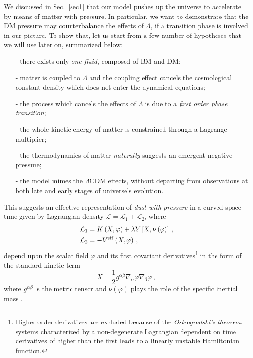 \documentclass[twocolumn,showpacs, nofootinbib,aps,superscriptaddress, eqsecnum,prd,prl,notitlepage,showkeys,10pt,reprint]{revtex4-1}
\begin{document}
We discussed in Sec.~\ref{sec1} that our model pushes up the universe to accelerate by means of matter with pressure. In particular, we want to demonstrate that the DM pressure may counterbalance the effects of $\Lambda$, if a transition phase is involved in our picture. To show that, let us start from a few number of hypotheses that we will use later on, summarized below:
\begin{itemize}
\item[-] there exists only \emph{one fluid}, composed of BM and DM;
\item[-] matter is coupled to $\Lambda$ and the coupling effect cancels the cosmological constant density which does not enter the dynamical equations;
\item[-] the process which cancels the effects of $\Lambda$ is due to a \emph{first order phase transition};
\item[-] the whole  kinetic energy of matter is constrained through a Lagrange multiplier;
\item[-] the thermodynamics of matter \emph{naturally} suggests an emergent negative pressure;
\item[-] the model mimes the $\Lambda$CDM effects, without departing from observations at both late and early stages of universe's evolution.
\end{itemize}

This suggests an effective representation of \emph{dust with pressure} in a curved space-time given by Lagrangian density $\mathcal{L}=\mathcal{L}_1+\mathcal{L}_2$, where
%
\begin{align}
\label{eq:1}
\mathcal{L}_1 &= K\left(X,\varphi\right) +\lambda Y\left[X,\nu\left(\varphi\right)\right]\,,\\
\label{eq:1bi}
\mathcal{L}_2 &= -V^{\rm eff}\left(X,\varphi\right)\,,
\end{align}
%
depend upon the scalar field $\varphi$ and its first covariant derivatives\footnote{Higher order derivatives are excluded because of the \textit{Ostrogradski's theorem}: systems characterized by a non-degenerate Lagrangian dependent on time derivatives of higher than the first leads to a linearly unstable Hamiltonian function.} in the form of the standard kinetic term
%
\begin{equation}
\label{eq:2}
X = \frac{1}{2}g^{\alpha\beta}\nabla_\alpha \varphi \nabla_\beta\varphi\,,
\end{equation}
%
where $g^{\alpha\beta}$ is the metric tensor and $\nu(\varphi)$ plays the role of the specific inertial mass \cite{1970PhRvD...2.2762S}.
\end{document}
